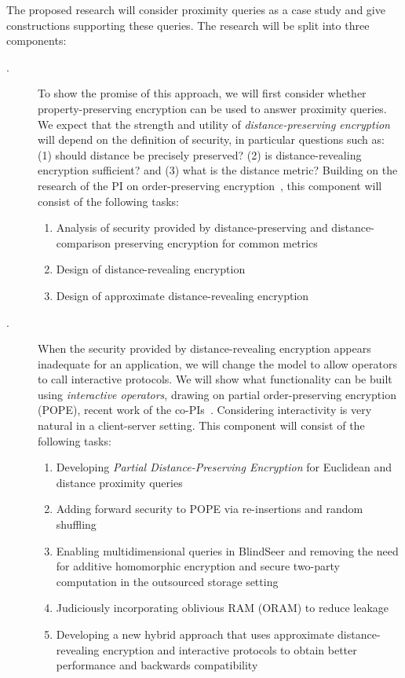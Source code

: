 \noindent
The proposed research will
consider proximity queries as a case study and give constructions supporting
these queries.  The research will be split into three components:
\begin{description}
\item[.] To show the promise of this approach, we
will first consider whether property-preserving encryption can be used
to answer proximity queries.  We expect that the strength and utility of
\emph{distance-preserving encryption} will depend on the definition of
security, in particular questions such as: (1) should distance be precisely preserved? 
(2) is distance-revealing encryption sufficient? and (3) what is the distance
metric? Building on the research of the PI on order-preserving
encryption~\cite{EC:BCLO09,C:BolCheONe11}, this component will consist
of the following tasks:
\begin{enumerate}
\setlength\itemsep{0em}
\item Analysis of security provided by distance-preserving and distance-comparison preserving encryption for common metrics
\item Design of distance-revealing encryption
\item Design of approximate distance-revealing encryption
\end{enumerate}

\item[.] When the security provided by
distance-revealing encryption appears inadequate for an application, we
will change the model to allow operators to call interactive protocols.
We will show what functionality can be built using \emph{interactive
operators}, drawing on partial order-preserving encryption (POPE), recent work of the
co-PIs~\cite{SP:PKVKMC14,CCS:RACY16}.  Considering interactivity is very natural in a client-server setting. This component will consist of
the following tasks:
\begin{enumerate}
\setlength\itemsep{0em}
\item Developing \emph{Partial Distance-Preserving Encryption} for Euclidean and distance proximity  queries
\item Adding forward security to POPE via
  re-insertions and random shuffling
\item Enabling multidimensional queries in BlindSeer and removing the need for
  additive homomorphic encryption and secure two-party computation in the outsourced storage
  setting 
\item Judiciously incorporating oblivious RAM (ORAM) to reduce leakage
\item Developing a new hybrid approach that uses approximate
  distance-revealing encryption and interactive protocols to obtain
  better performance and backwards compatibility
\end{enumerate}


\end{description}
